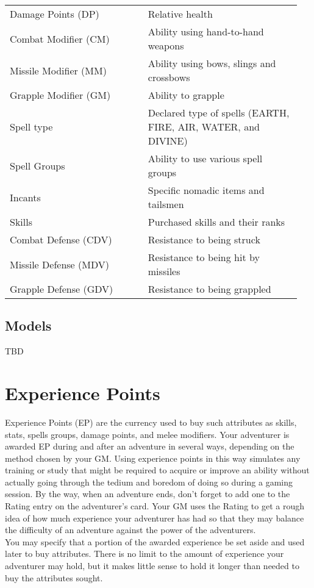 \begin{multicols*}{2}
\noindent\begin{tabular}{@{}p{0.45\linewidth} p{0.5\linewidth}}
Damage Points (DP) & Relative health\\
Combat Modifier (CM) & Ability using hand-to-hand weapons\\
Missile Modifier (MM) & Ability using bows, slings and crossbows\\
Grapple Modifier (GM) & Ability to grapple\\
Spell type & Declared type of spells (EARTH, FIRE, AIR, WATER, and DIVINE)\\
Spell Groups & Ability to use various spell groups\\
Incants & Specific nomadic items and tailsmen\\
Skills & Purchased skills and their ranks\\
Combat Defense (CDV) & Resistance to being struck\\
Missile Defense (MDV) & Resistance to being hit by missiles\\
Grapple Defense (GDV) & Resistance to being grappled\\
\end{tabular}

\subsection{Models}
TBD
\section{Experience Points}
Experience Points (EP) are the currency used to buy such attributes as skills, stats, spells groups, damage points, and melee modifiers. Your adventurer is awarded EP during and after an adventure in several ways, depending on the method chosen by your GM. Using experience points in this way simulates any training or study that might be required to acquire or improve an ability without actually going through the tedium and boredom of doing so during a gaming session. By the way, when an adventure ends, don’t forget to add one to the Rating entry on the adventurer’s card. Your GM uses the Rating to get a rough idea of how much experience your adventurer has had so that they may balance the difficulty of an adventure against the power of the adventurers.\\
You may specify that a portion of the awarded experience be set aside and used later to buy attributes. There is no limit to the amount of experience your adventurer may hold, but it makes little sense to hold it longer than needed to buy the attributes sought.

\end{multicols*}
